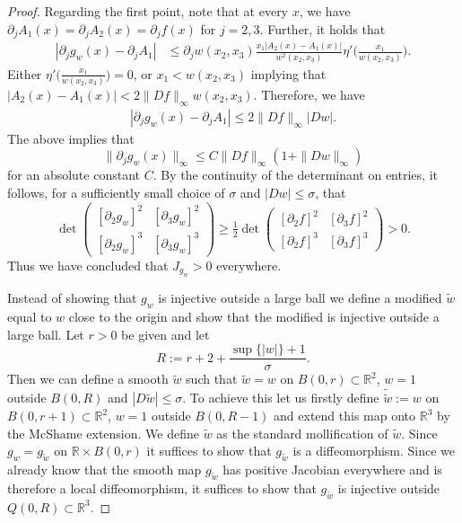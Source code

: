 \documentclass[10pt,a4paper]{amsart}
\def\er{\mathbb R}
\begin{document}
\begin{proof}
		
		Regarding the first point, note that at every $x$, we have $\partial_j A_1(x) = \partial_j A_2(x) = \partial_j f(x)$ for $ j = 2, 3$. Further, it holds that
		$$
			\begin{aligned}
				|\partial_jg_w(x) - \partial_jA_1| &\leq \partial_jw(x_2,x_3) \frac{x_1|A_2(x) - A_1(x)|}{w^2(x_2,x_3)}\eta'\Big(\frac{x_1}{w(x_2,x_3)}\Big).
			\end{aligned}
			$$
		Either $\eta'\Big(\frac{x_1}{w(x_2,x_3)}\Big) = 0$, or $x_1<w(x_2,x_3)$ implying that $|A_2(x) - A_1(x)|< 2\|Df\|_{\infty}w(x_2,x_3)$. Therefore, we have
		\begin{equation}\label{EstimateDJ}
				\begin{aligned}
				|\partial_jg_w(x) - \partial_jA_1|\leq 2\|Df\|_{\infty}|Dw|.
			\end{aligned}
		\end{equation}
		The above implies that
		\begin{equation}\label{TruEstimateDJ}
				\|\partial_jg_w(x)\|_{\infty}\leq C\|Df\|_{\infty}(1+\|Dw\|_{\infty})
		\end{equation}
		for an absolute constant $C$. By the continuity of the determinant on entries, it follows, for a sufficiently small choice of $\sigma$ and $|Dw|\leq \sigma$, that 
		\begin{equation}\label{Poker}
			\det \left( \begin{matrix}
			[\partial_2g_w]^2 & [\partial_3g_w]^2\\
			[\partial_2g_w]^3 & [\partial_3g_w]^3
		\end{matrix}\right) \geq \tfrac{1}{2}\det \left( \begin{matrix}
		[\partial_2f]^2 & [\partial_3f]^2\\
		[\partial_2f]^3 & [\partial_3f]^3
		\end{matrix}\right)>0.
		\end{equation}
		Thus we have concluded that $J_{g_w}>0$ everywhere.
		
		Instead of showing that $g_{w}$ is injective outside a large ball we define a modified $\tilde{w}$ equal to $w$ close to the origin  and show that the modified is injective outside a large ball. Let $r>0$ be given and let
		$$
			R:=r+2+\frac{\sup\{|w|\}+1}{\sigma}.
		$$
		Then we can define a smooth $\tilde{w}$ such that $\tilde{w} = w$ on $B(0,r)\subset \er^2$, $w= 1$ outside $B(0,R)$ and $|D\tilde{w}|\leq \sigma$. To achieve this let us firstly define $\tilde{\tilde{w}} := w$ on $B(0,r+1)\subset \er^2$, $w= 1$ outside $B(0,R-1)$ and extend this map onto $\er^3$ by the McShame extension. We define $\tilde{w}$ as the standard mollification of $\tilde{w}$. Since $g_w = g_{\tilde{w}}$ on $\er\times B(0,r)$ it suffices to show that $g_{\tilde{w}}$ is a diffeomorphism. Since we already know that the smooth map $g_{\tilde{w}}$ has positive Jacobian everywhere and is therefore a local diffeomorphism, it suffices to show that $g_{\tilde{w}}$ is injective outside $Q(0,R)\subset \er^3$.
		

\end{proof}
\end{document}
